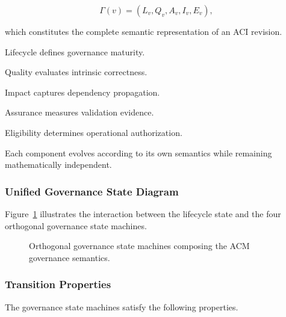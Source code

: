 \documentclass[10pt]{article}
\begin{document}
\[
\Gamma(v)
=
(
L_v,
Q_v,
A_v,
I_v,
E_v
),
\]

which constitutes the complete semantic representation of an ACI revision.

Lifecycle defines governance maturity.

Quality evaluates intrinsic correctness.

Impact captures dependency propagation.

Assurance measures validation evidence.

Eligibility determines operational authorization.

Each component evolves according to its own semantics while remaining
mathematically independent.

\subsubsection{Unified Governance State Diagram}

Figure~\ref{fig:governance_state_machine} illustrates the interaction between
the lifecycle state and the four orthogonal governance state machines.

%
%
%
%
%
%
%

\begin{figure}[t]
\centering
{}
\caption{Orthogonal governance state machines composing the ACM governance semantics.}
\label{fig:governance_state_machine}
\end{figure}

\subsubsection{Transition Properties}

The governance state machines satisfy the following properties.
\end{document}

